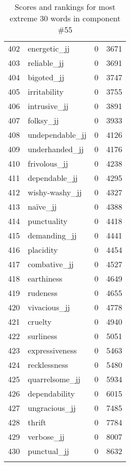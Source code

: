 \begin{longtable}[!htbp]{| rlr@{.}l |}
    402 & energetic\_jj & 0 & 3671 \\
    403 & reliable\_jj & 0 & 3691 \\
    404 & bigoted\_jj & 0 & 3747 \\
    405 & irritability & 0 & 3755 \\
    406 & intrusive\_jj & 0 & 3891 \\
    407 & folksy\_jj & 0 & 3933 \\
    408 & undependable\_jj & 0 & 4126 \\
    409 & underhanded\_jj & 0 & 4176 \\
    410 & frivolous\_jj & 0 & 4238 \\
    411 & dependable\_jj & 0 & 4295 \\
    412 & wishy-washy\_jj & 0 & 4327 \\
    413 & naïve\_jj & 0 & 4388 \\
    414 & punctuality & 0 & 4418 \\
    415 & demanding\_jj & 0 & 4441 \\
    416 & placidity & 0 & 4454 \\
    417 & combative\_jj & 0 & 4527 \\
    418 & earthiness & 0 & 4649 \\
    419 & rudeness & 0 & 4655 \\
    420 & vivacious\_jj & 0 & 4778 \\
    421 & cruelty & 0 & 4940 \\
    422 & surliness & 0 & 5051 \\
    423 & expressiveness & 0 & 5463 \\
    424 & recklessness & 0 & 5480 \\
    425 & quarrelsome\_jj & 0 & 5934 \\
    426 & dependability & 0 & 6015 \\
    427 & ungracious\_jj & 0 & 7485 \\
    428 & thrift & 0 & 7784 \\
    429 & verbose\_jj & 0 & 8007 \\
    430 & punctual\_jj & 0 & 8632 \\
    \hline
    \caption{Scores and rankings for most extreme 30 words in component \#55} \\
\end{longtable}

